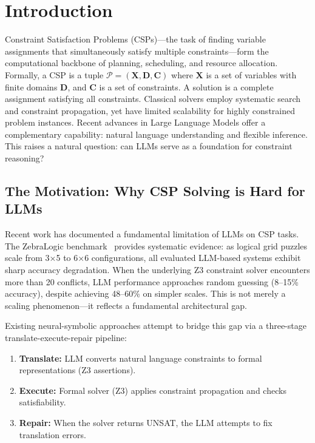 
\section{Introduction}

Constraint Satisfaction Problems (CSPs)—the task of finding variable assignments that simultaneously satisfy multiple constraints—form the computational backbone of planning, scheduling, and resource allocation. Formally, a CSP is a tuple $\mathcal{P} = (\mathbf{X}, \mathbf{D}, \mathbf{C})$ where $\mathbf{X}$ is a set of variables with finite domains $\mathbf{D}$, and $\mathbf{C}$ is a set of constraints. A solution is a complete assignment satisfying all constraints. Classical solvers employ systematic search and constraint propagation, yet have limited scalability for highly constrained problem instances. Recent advances in Large Language Models offer a complementary capability: natural language understanding and flexible inference. This raises a natural question: can LLMs serve as a foundation for constraint reasoning?

\subsection{The Motivation: Why CSP Solving is Hard for LLMs}

Recent work has documented a fundamental limitation of LLMs on CSP tasks. The ZebraLogic benchmark~\citep{lin2025zebralogic} provides systematic evidence: as logical grid puzzles scale from 3×5 to 6×6 configurations, all evaluated LLM-based systems exhibit sharp accuracy degradation. When the underlying Z3 constraint solver encounters more than 20 conflicts, LLM performance approaches random guessing (8--15\% accuracy), despite achieving 48--60\% on simpler scales. This is not merely a scaling phenomenon—it reflects a fundamental architectural gap.

Existing neural-symbolic approaches attempt to bridge this gap via a three-stage translate-execute-repair pipeline:
\begin{enumerate}
    \item \textbf{Translate:} LLM converts natural language constraints to formal representations (Z3 assertions).
    \item \textbf{Execute:} Formal solver (Z3) applies constraint propagation and checks satisfiability.
    \item \textbf{Repair:} When the solver returns UNSAT, the LLM attempts to fix translation errors.
\end{enumerate}

